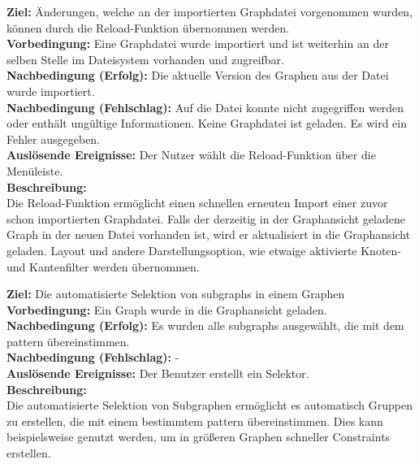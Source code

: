 \label{fa:reload}
\textbf{Ziel:} Änderungen, welche an der importierten Graphdatei vorgenommen wurden, können durch die Reload-Funktion übernommen werden.\\
\textbf{Vorbedingung:} Eine Graphdatei wurde importiert und ist weiterhin an der selben Stelle im Dateisystem vorhanden und zugreifbar.\\
\textbf{Nachbedingung (Erfolg):} Die aktuelle Version des Graphen aus der Datei wurde importiert.\\
\textbf{Nachbedingung (Fehlschlag):} Auf die Datei konnte nicht zugegriffen werden oder enthält ungültige Informationen. Keine Graphdatei ist geladen. Es wird ein Fehler ausgegeben.\\
\textbf{Auslösende Ereignisse:} Der Nutzer wählt die Reload-Funktion über die Menüleiste.\\
\textbf{Beschreibung:}\\
Die Reload-Funktion ermöglicht einen schnellen erneuten Import einer zuvor schon importierten Graphdatei.
Falls der derzeitig in der Graphansicht geladene Graph in der neuen Datei vorhanden ist, wird er aktualisiert in die Graphansicht geladen.
Layout und andere Darstellungsoption, wie etwaige aktivierte Knoten- und Kantenfilter werden übernommen.

\label{fa:gpm}
\textbf{Ziel:} Die automatisierte Selektion von \glspl{subgraph} in einem Graphen \\
\textbf{Vorbedingung:} Ein Graph wurde in die Graphansicht geladen.\\
\textbf{Nachbedingung (Erfolg):} Es wurden alle \glspl{subgraph} ausgewählt, die mit dem \gls{pattern} übereinstimmen.\\
\textbf{Nachbedingung (Fehlschlag):} - \\
\textbf{Auslösende Ereignisse:} Der Benutzer erstellt ein Selektor.\\
\textbf{Beschreibung:}\\
Die automatisierte Selektion von Subgraphen ermöglicht es automatisch Gruppen zu erstellen, die mit einem bestimmtem \gls{pattern} übereinstimmen. Dies kann beispielsweise genutzt werden, um in größeren Graphen schneller Constraints erstellen.\\

